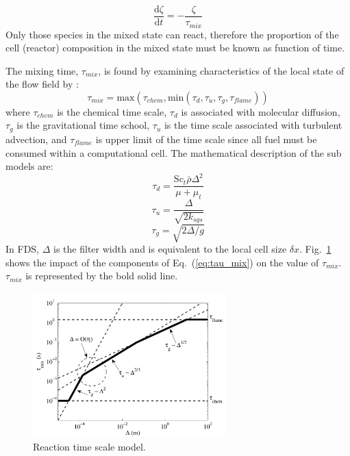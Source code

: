 \begin{equation}\label{eq:zeta}
\frac{\mbox{d}\zeta}{\mbox{d}t}=-\frac{\zeta}{\tau_{mix}}
\end{equation}     
Only those species in the mixed state can react, therefore the proportion of the cell (reactor) composition in the mixed state must be known as function of time. 

The mixing time, $\tau_{mix}$, is found by examining characteristics of the local state of the flow field by \cite{McDermott:2011}:
\begin{equation}\label{eq:tau_mix}
\tau_{mix}=\mbox{max}(\tau_{chem},\mbox{min}(\tau_{d},\tau_{u},\tau_{g},\tau_{flame}))
\end{equation}
where $\tau_{chem}$ is the chemical time scale, $\tau_{d}$ is associated with molecular diffusion, $\tau_{g}$ is the gravitational time school, $\tau_{u}$ is the time scale associated with turbulent advection, and $\tau_{flame}$ is upper limit of the time scale since all fuel must be consumed within a computational cell. The mathematical description of the sub models are:
\begin{equation}\label{eq:tau_d}
\tau_{d}=\frac{\mbox{Sc}_{t}\bar{\rho}\Delta^2}{\mu+\mu_{t}}
\end{equation}
\begin{equation}\label{eq:tau_u}
\tau_{u}=\frac{\Delta}{\sqrt{2k_{sgs}}}
\end{equation}
\begin{equation}\label{eq:tau_g}
\tau_{g}=\sqrt{2\Delta/g}
\end{equation}
In FDS, $\Delta$ is the filter width and is equivalent to the local cell size $\delta x$. Fig.~\ref{fig:reac_time_scale} shows the impact of the components of Eq.~(\ref{eq:tau_mix}) on the value of $\tau_{mix}$. $\tau_{mix}$ is represented by the bold solid line.

\begin{figure}[h!]
\begin{center}
\includegraphics[height=2.2in]{FIGURES/reaction_time_scale}
\caption{\label{fig:reac_time_scale} Reaction time scale model.}
\end{center}
\end{figure}

